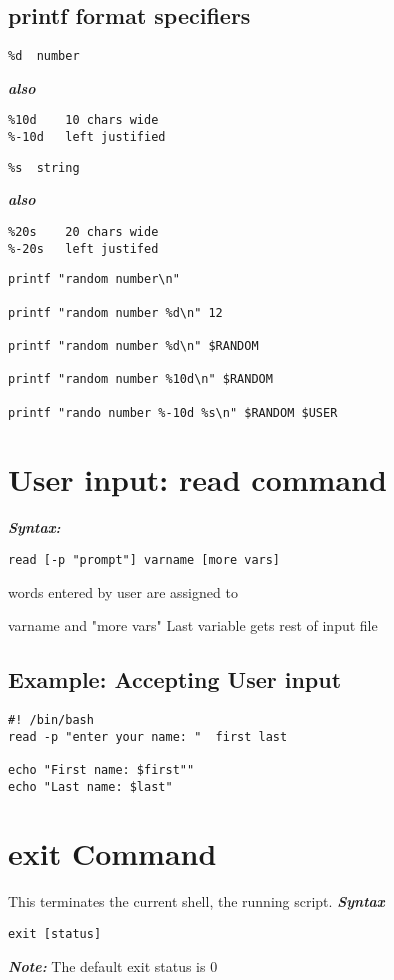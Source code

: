 \documentclass{report}
\begin{document}
\subsection{printf format specifiers}
\begin{verbatim}
%d  number
\end{verbatim}
\textit{\textbf{also}}
\begin{verbatim}
%10d    10 chars wide
%-10d   left justified
\end{verbatim}
\begin{verbatim}
%s  string
\end{verbatim}
\textit{\textbf{also}}
\begin{verbatim}
%20s    20 chars wide
%-20s   left justifed
\end{verbatim}
\newpage
\begin{mdframed}
  \begin{verbatim}
printf "random number\n"

printf "random number %d\n" 12

printf "random number %d\n" $RANDOM

printf "random number %10d\n" $RANDOM

printf "rando number %-10d %s\n" $RANDOM $USER
\end{verbatim}
\end{mdframed}
\section{User input: read command}
\textit{\textbf{Syntax:}}
\begin{verbatim}
read [-p "prompt"] varname [more vars]
\end{verbatim}
words entered by user are assigned to \vspace{2mm}

\noindent varname and "more vars"
\bigbreak \noindent
Last variable gets rest of input file
\subsection{Example: Accepting User input}
\begin{verbatim}
#! /bin/bash
read -p "enter your name: "  first last

echo "First name: $first""
echo "Last name: $last"
\end{verbatim}
\section{exit Command}
This terminates the current shell, the running script.
\bigbreak \noindent
\textit{\textbf{Syntax}}
\begin{verbatim}
exit [status]
\end{verbatim}
\textit{\textbf{Note:}} The default exit status is 0
\end{document}
